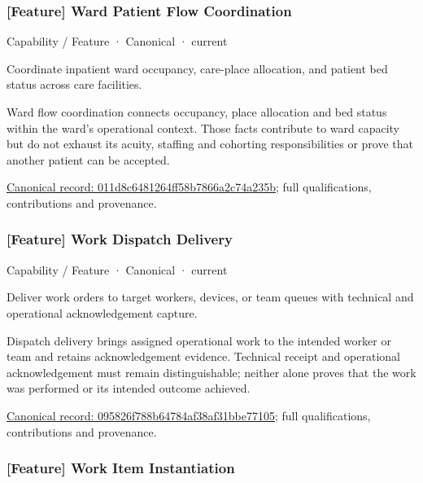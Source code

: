 \subsubsection{[Feature] Ward Patient Flow Coordination}

\label{element:011d8c6481264ff58b7866a2c74a235b}
{\small Capability / Feature · Canonical · current}\par

Coordinate inpatient ward occupancy, care-place allocation, and patient bed status across care facilities.



Ward flow coordination connects occupancy, place allocation and bed status within the ward's operational context. Those facts contribute to ward capacity but do not exhaust its acuity, staffing and cohorting responsibilities or prove that another patient can be accepted.


{\footnotesize \href{../../../../continuum/strategy/capability/feature/011d8c6481264ff58b7866a2c74a235b.md}{Canonical record: 011d8c6481264ff58b7866a2c74a235b}; full qualifications, contributions and provenance.}\par
\subsubsection{[Feature] Work Dispatch Delivery}

\label{element:095826f788b64784af38af31bbe77105}
{\small Capability / Feature · Canonical · current}\par

Deliver work orders to target workers, devices, or team queues with technical and operational acknowledgement capture.



Dispatch delivery brings assigned operational work to the intended worker or team and retains acknowledgement evidence. Technical receipt and operational acknowledgement must remain distinguishable; neither alone proves that the work was performed or its intended outcome achieved.


{\footnotesize \href{../../../../continuum/strategy/capability/feature/095826f788b64784af38af31bbe77105.md}{Canonical record: 095826f788b64784af38af31bbe77105}; full qualifications, contributions and provenance.}\par
\subsubsection{[Feature] Work Item Instantiation}

